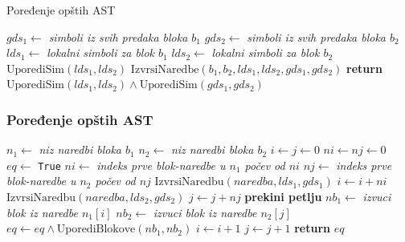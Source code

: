 \documentclass{beamer}
\begin{document}
\begin{frame}{Poređenje opštih AST}
    \begin{algorithmic}[1]
        \State $gds_1 \gets $ \emph{simboli iz svih predaka bloka $b_1$}
        \State $gds_2 \gets $ \emph{simboli iz svih predaka bloka $b_2$}
        \State $lds_1 \gets $ \emph{lokalni simboli za blok $b_1$}
        \State $lds_2 \gets $ \emph{lokalni simboli za blok $b_2$}
        \State $\text{UporediSim}(lds_1, lds_2)$
        \State $\text{IzvrsiNaredbe}(b_1, b_2, lds_1, lds_2, gds_1, gds_2)$
        \State \textbf{return} $\text{UporediSim}(lds_1, lds_2) \wedge \text{UporediSim}(gds_1, gds_2)$
        \EndProcedure
    \end{algorithmic}
\end{frame}

\begin{frame}[fragile]
    \frametitle{{Poređenje opštih AST}}
    \scriptsize
    \begin{algorithmic}[1]
    \State $n_1 \gets $ \emph{niz naredbi bloka $b_1$} 
    \State $n_2 \gets $ \emph{niz naredbi bloka $b_2$}
    \State $i \gets j \gets 0$
    \State $ni \gets nj \gets 0$
    \State $eq \gets $ \texttt{True}
        \State $ni \gets $ \emph{indeks prve blok-naredbe u $n_1$ počev od $ni$}
        \State $nj \gets $ \emph{indeks prve blok-naredbe u $n_2$ počev od $nj$}
            \State $\text{IzvrsiNaredbu}(naredba, lds_1, gds_1)$
        \EndFor
        \State $i \gets i + ni$
            \State $\text{IzvrsiNaredbu}(naredba, lds_2, gds_2)$
        \EndFor
        \State $j \gets j + nj$
            \State \textbf{prekini petlju}
        \EndIf
        \State $nb_1 \gets $ \emph{izvuci blok iz naredbe $n_1[i]$}
        \State $nb_2 \gets $ \emph{izvuci blok iz naredbe $n_2[j]$}
        \State $eq \gets eq \wedge \text{UporediBlokove}(nb_1, nb_2)$
        \State $i \gets i + 1$
        \State $j \gets j + 1$
    \EndWhile
    \State \textbf{return} $eq$
    \EndProcedure
    \end{algorithmic}
\end{frame}
\end{document}

